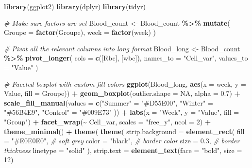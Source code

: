 \documentclass[
]{article}
\newenvironment{Shaded}{\begin{snugshade}}{\end{snugshade}}
\newcommand{\AttributeTok}[1]{\textcolor[rgb]{0.13,0.29,0.53}{#1}}
\newcommand{\CommentTok}[1]{\textcolor[rgb]{0.56,0.35,0.01}{\textit{#1}}}
\newcommand{\ConstantTok}[1]{\textcolor[rgb]{0.56,0.35,0.01}{#1}}
\newcommand{\DecValTok}[1]{\textcolor[rgb]{0.00,0.00,0.81}{#1}}
\newcommand{\FloatTok}[1]{\textcolor[rgb]{0.00,0.00,0.81}{#1}}
\newcommand{\FunctionTok}[1]{\textcolor[rgb]{0.13,0.29,0.53}{\textbf{#1}}}
\newcommand{\NormalTok}[1]{#1}
\newcommand{\OtherTok}[1]{\textcolor[rgb]{0.56,0.35,0.01}{#1}}
\newcommand{\SpecialCharTok}[1]{\textcolor[rgb]{0.81,0.36,0.00}{\textbf{#1}}}
\newcommand{\StringTok}[1]{\textcolor[rgb]{0.31,0.60,0.02}{#1}}
\begin{document}
\begin{Shaded}
\begin{Highlighting}[]
\FunctionTok{library}\NormalTok{(ggplot2)}
\FunctionTok{library}\NormalTok{(dplyr)}
\FunctionTok{library}\NormalTok{(tidyr)}

\CommentTok{\# Make sure factors are set}
\NormalTok{Blood\_count }\OtherTok{\textless{}{-}}\NormalTok{ Blood\_count }\SpecialCharTok{\%\textgreater{}\%}
  \FunctionTok{mutate}\NormalTok{(}
    \AttributeTok{Groupe =} \FunctionTok{factor}\NormalTok{(Groupe),}
    \AttributeTok{week =} \FunctionTok{factor}\NormalTok{(week)}
\NormalTok{  )}

\CommentTok{\# Pivot all the relevant columns into long format}
\NormalTok{Blood\_long }\OtherTok{\textless{}{-}}\NormalTok{ Blood\_count }\SpecialCharTok{\%\textgreater{}\%}
  \FunctionTok{pivot\_longer}\NormalTok{(}
    \AttributeTok{cols =} \FunctionTok{c}\NormalTok{(}\StringTok{\textasciigrave{}}\AttributeTok{[Rbc]}\StringTok{\textasciigrave{}}\NormalTok{, }\StringTok{\textasciigrave{}}\AttributeTok{[wbc]}\StringTok{\textasciigrave{}}\NormalTok{),}
    \AttributeTok{names\_to =} \StringTok{"Cell\_var"}\NormalTok{,}
    \AttributeTok{values\_to =} \StringTok{"Value"}
\NormalTok{  )}

\CommentTok{\# Faceted boxplot with custom fill colors}
\FunctionTok{ggplot}\NormalTok{(Blood\_long, }\FunctionTok{aes}\NormalTok{(}\AttributeTok{x =}\NormalTok{ week, }\AttributeTok{y =}\NormalTok{ Value, }\AttributeTok{fill =}\NormalTok{ Groupe)) }\SpecialCharTok{+}
  \FunctionTok{geom\_boxplot}\NormalTok{(}\AttributeTok{outlier.shape =} \ConstantTok{NA}\NormalTok{, }\AttributeTok{alpha =} \FloatTok{0.7}\NormalTok{) }\SpecialCharTok{+}
  \FunctionTok{scale\_fill\_manual}\NormalTok{(}\AttributeTok{values =} \FunctionTok{c}\NormalTok{(}\StringTok{"Summer"} \OtherTok{=} \StringTok{"\#D55E00"}\NormalTok{, }\StringTok{"Winter"} \OtherTok{=} \StringTok{"\#56B4E9"}\NormalTok{, }\StringTok{"Control"} \OtherTok{=} \StringTok{"\#009E73"}\NormalTok{ )) }\SpecialCharTok{+}
  \FunctionTok{labs}\NormalTok{(}\AttributeTok{x =} \StringTok{"Week"}\NormalTok{, }\AttributeTok{y =} \StringTok{"Value"}\NormalTok{, }\AttributeTok{fill =} \StringTok{"Group"}\NormalTok{) }\SpecialCharTok{+}
  \FunctionTok{facet\_wrap}\NormalTok{(}\SpecialCharTok{\textasciitilde{}}\NormalTok{ Cell\_var, }\AttributeTok{scales =} \StringTok{"free\_y"}\NormalTok{, }\AttributeTok{ncol =} \DecValTok{2}\NormalTok{) }\SpecialCharTok{+}
  \FunctionTok{theme\_minimal}\NormalTok{() }\SpecialCharTok{+}
  \FunctionTok{theme}\NormalTok{(}
     \FunctionTok{theme}\NormalTok{(}
  \AttributeTok{strip.background =} \FunctionTok{element\_rect}\NormalTok{(}
    \AttributeTok{fill =} \StringTok{"\#E0E0E0"}\NormalTok{,  }\CommentTok{\# soft grey}
    \AttributeTok{color =} \StringTok{"black"}\NormalTok{,   }\CommentTok{\# border color}
    \AttributeTok{size =} \FloatTok{0.3}\NormalTok{,        }\CommentTok{\# border thickness}
    \AttributeTok{linetype =} \StringTok{"solid"}
\NormalTok{  ),}
  \AttributeTok{strip.text =} \FunctionTok{element\_text}\NormalTok{(}\AttributeTok{face =} \StringTok{"bold"}\NormalTok{, }\AttributeTok{size =} \DecValTok{12}\NormalTok{)}
  

\end{Highlighting}
\end{Shaded}
\end{document}
